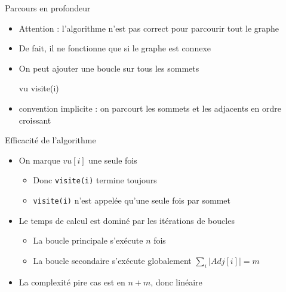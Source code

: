 \documentclass[xcolor=dvipsnames]{beamer}
\begin{document}
        \begin{frame}{Parcours en profondeur}
            \begin{itemize}
                \item Attention : l'algorithme n'est pas correct pour parcourir tout le graphe
                \item De fait, il ne fonctionne que si le graphe est connexe 
                \pause 
                \item On peut ajouter une boucle sur tous les sommets 
                \pause 
                \begin{algorithm}[H]
                    \begin{algorithmic}[1]
                        \State vu 
                                \State visite(i)
                            \EndIf
                        \EndFor
                     \end{algorithmic}
                    \caption{Parcours en profondeur}
                    \label{alg:prof:alg}
                    \end{algorithm}
                \pause 
                \item convention implicite : on parcourt les sommets et les adjacents en ordre croissant
            \end{itemize}
        \end{frame}
        
        
         
        \begin{frame}{Efficacité de l'algorithme}
            \begin{itemize}
                \item On marque $vu[i]$ une seule fois 
                \begin{itemize}
                    \item Donc \texttt{visite(i)} termine toujours
                    \item \texttt{visite(i)} n'est appelée qu'une seule fois par sommet
                \end{itemize}
                \item Le temps de calcul est dominé par les itérations de boucles
                \begin{itemize}
                    \item La boucle principale s'exécute $n$ fois 
                    \item La boucle secondaire s'exécute globalement $\sum_i | Adj[i] | = m$
                \end{itemize}
                \item La complexité pire cas est en $n+m$, donc linéaire
            \end{itemize}
        \end{frame}
        
\end{document}
